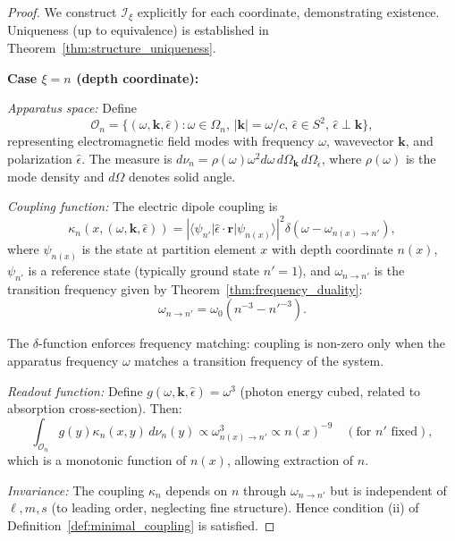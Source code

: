 \documentclass[twocolumn,10pt,a4paper]{article}
\theoremstyle{remark}
\newcommand{\oscillator}{\mathcal{O}}
\begin{document}
\begin{proof}
We construct $\mathcal{I}_\xi$ explicitly for each coordinate, demonstrating existence. Uniqueness (up to equivalence) is established in Theorem~\ref{thm:structure_uniqueness}.

\textbf{Case $\xi = n$ (depth coordinate):}

\emph{Apparatus space:} Define
\begin{equation}
\oscillator_n = \{(\omega, \mathbf{k}, \hat{\epsilon}) : \omega \in \Omega_n, \, |\mathbf{k}| = \omega/c, \, \hat{\epsilon} \in S^2, \, \hat{\epsilon} \perp \mathbf{k}\},
\end{equation}
representing electromagnetic field modes with frequency $\omega$, wavevector $\mathbf{k}$, and polarization $\hat{\epsilon}$. The measure is $d\nu_n = \rho(\omega) \omega^2 d\omega \, d\Omega_{\mathbf{k}} \, d\Omega_{\hat{\epsilon}}$, where $\rho(\omega)$ is the mode density and $d\Omega$ denotes solid angle.

\emph{Coupling function:} The electric dipole coupling is
\begin{equation}
\kappa_n(x, (\omega, \mathbf{k}, \hat{\epsilon})) = \left|\langle \psi_{n'} | \hat{\epsilon} \cdot \mathbf{r} | \psi_{n(x)} \rangle\right|^2 \delta(\omega - \omega_{n(x) \to n'}),
\end{equation}
where $\psi_{n(x)}$ is the state at partition element $x$ with depth coordinate $n(x)$, $\psi_{n'}$ is a reference state (typically ground state $n' = 1$), and $\omega_{n \to n'}$ is the transition frequency given by Theorem~\ref{thm:frequency_duality}:
\begin{equation}
\omega_{n \to n'} = \omega_0 (n^{-3} - n'^{-3}).
\end{equation}

The $\delta$-function enforces frequency matching: coupling is non-zero only when the apparatus frequency $\omega$ matches a transition frequency of the system.

\emph{Readout function:} Define $g(\omega, \mathbf{k}, \hat{\epsilon}) = \omega^3$ (photon energy cubed, related to absorption cross-section). Then:
\begin{equation}
\int_{\oscillator_n} g(y) \kappa_n(x, y) \, d\nu_n(y) \propto \omega_{n(x) \to n'}^3 \propto n(x)^{-9} \quad (\text{for } n' \text{ fixed}),
\end{equation}
which is a monotonic function of $n(x)$, allowing extraction of $n$.

\emph{Invariance:} The coupling $\kappa_n$ depends on $n$ through $\omega_{n \to n'}$ but is independent of $\ell, m, s$ (to leading order, neglecting fine structure). Hence condition (ii) of Definition~\ref{def:minimal_coupling} is satisfied.


\end{proof}
\end{document}
